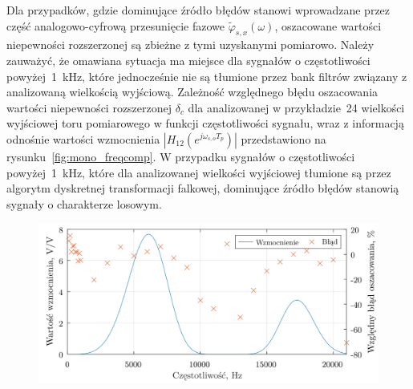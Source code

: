 Dla przypadków, gdzie dominujące źródło błędów stanowi wprowadzane przez część analogowo-cyfrową przesunięcie fazowe $\tilde{\varphi}_{s,x}(\omega)$, oszacowane wartości niepewności rozszerzonej są zbieżne z tymi uzyskanymi pomiarowo. Należy zauważyć, że omawiana sytuacja ma miejsce dla sygnałów o częstotliwości powyżej~\qty{1}{kHz}, które jednocześnie nie są tłumione przez bank filtrów związany z analizowaną wielkością wyjściową. Zależność względnego błędu oszacowania wartości niepewności rozszerzonej $\delta_{c}$ dla analizowanej w przykładzie~\qty{24}{\numTej} wielkości wyjściowej toru pomiarowego w funkcji częstotliwości sygnału, wraz z informacją odnośnie wartości wzmocnienia $|H_{12}(e^{j \omega_{s,o} T_{p}})|$ przedstawiono na rysunku~\ref{fig:mono_freqcomp}. W przypadku sygnałów o częstotliwości powyżej~\qty{1}{kHz}, które dla analizowanej wielkości wyjściowej tłumione są przez algorytm dyskretnej transformacji falkowej, dominujące źródło błędów stanowią sygnały o charakterze losowym.

\begin{figure}[htb!]
\begin{center}
\includegraphics{obrazki/mono_freqcomp}
\end{center}
\end{figure}

